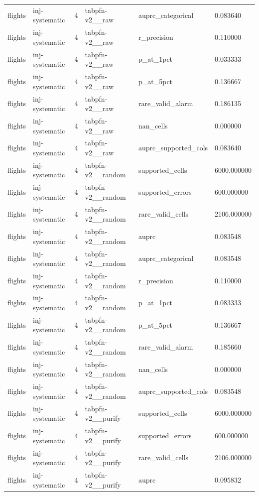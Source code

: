 \begin{tabular}{llllll}
flights & inj-systematic & 4 & tabpfn-v2\_\_raw & auprc\_categorical & 0.083640 \\
flights & inj-systematic & 4 & tabpfn-v2\_\_raw & r\_precision & 0.110000 \\
flights & inj-systematic & 4 & tabpfn-v2\_\_raw & p\_at\_1pct & 0.033333 \\
flights & inj-systematic & 4 & tabpfn-v2\_\_raw & p\_at\_5pct & 0.136667 \\
flights & inj-systematic & 4 & tabpfn-v2\_\_raw & rare\_valid\_alarm & 0.186135 \\
flights & inj-systematic & 4 & tabpfn-v2\_\_raw & nan\_cells & 0.000000 \\
flights & inj-systematic & 4 & tabpfn-v2\_\_raw & auprc\_supported\_cols & 0.083640 \\
flights & inj-systematic & 4 & tabpfn-v2\_\_random & supported\_cells & 6000.000000 \\
flights & inj-systematic & 4 & tabpfn-v2\_\_random & supported\_errors & 600.000000 \\
flights & inj-systematic & 4 & tabpfn-v2\_\_random & rare\_valid\_cells & 2106.000000 \\
flights & inj-systematic & 4 & tabpfn-v2\_\_random & auprc & 0.083548 \\
flights & inj-systematic & 4 & tabpfn-v2\_\_random & auprc\_categorical & 0.083548 \\
flights & inj-systematic & 4 & tabpfn-v2\_\_random & r\_precision & 0.110000 \\
flights & inj-systematic & 4 & tabpfn-v2\_\_random & p\_at\_1pct & 0.083333 \\
flights & inj-systematic & 4 & tabpfn-v2\_\_random & p\_at\_5pct & 0.136667 \\
flights & inj-systematic & 4 & tabpfn-v2\_\_random & rare\_valid\_alarm & 0.185660 \\
flights & inj-systematic & 4 & tabpfn-v2\_\_random & nan\_cells & 0.000000 \\
flights & inj-systematic & 4 & tabpfn-v2\_\_random & auprc\_supported\_cols & 0.083548 \\
flights & inj-systematic & 4 & tabpfn-v2\_\_purify & supported\_cells & 6000.000000 \\
flights & inj-systematic & 4 & tabpfn-v2\_\_purify & supported\_errors & 600.000000 \\
flights & inj-systematic & 4 & tabpfn-v2\_\_purify & rare\_valid\_cells & 2106.000000 \\
flights & inj-systematic & 4 & tabpfn-v2\_\_purify & auprc & 0.095832 \\

\end{tabular}

